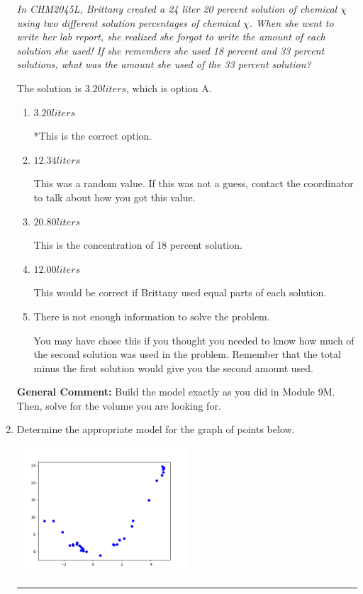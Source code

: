\documentclass{extbook}[14pt]
\newcommand{\litem}[1]{\item #1

\rule{\textwidth}{0.4pt}}
\begin{document}
\begin{enumerate}
{\begin{center}
    \textit{ In CHM2045L, Brittany created a 24 liter 20 percent solution of chemical $\chi$ using two different solution percentages of chemical $\chi$. When she went to write her lab report, she realized she forgot to write the amount of each solution she used! If she remembers she used 18 percent and 33 percent solutions, what was the amount she used of the 33 percent solution? }
\end{center}
The solution is \( 3.20 liters \), which is option A.\begin{enumerate}[label=\Alph*.]
\item \( 3.20 liters \)

*This is the correct option.
\item \( 12.34 liters \)

This was a random value. If this was not a guess, contact the coordinator to talk about how you got this value.
\item \( 20.80 liters \)

This is the concentration of 18 percent solution.
\item \( 12.00 liters \)

This would be correct if Brittany used equal parts of each solution.
\item \( \text{There is not enough information to solve the problem.} \)

You may have chose this if you thought you needed to know how much of the second solution was used in the problem. Remember that the total minus the first solution would give you the second amount used.
\end{enumerate}

\textbf{General Comment:} Build the model exactly as you did in Module 9M. Then, solve for the volume you are looking for.
}
\litem{
Determine the appropriate model for the graph of points below.

\begin{center}
    \includegraphics[width=0.5\textwidth]{../Figures/identifyModelGraph12A.png}
\end{center}


}
\end{enumerate}
\end{document}
